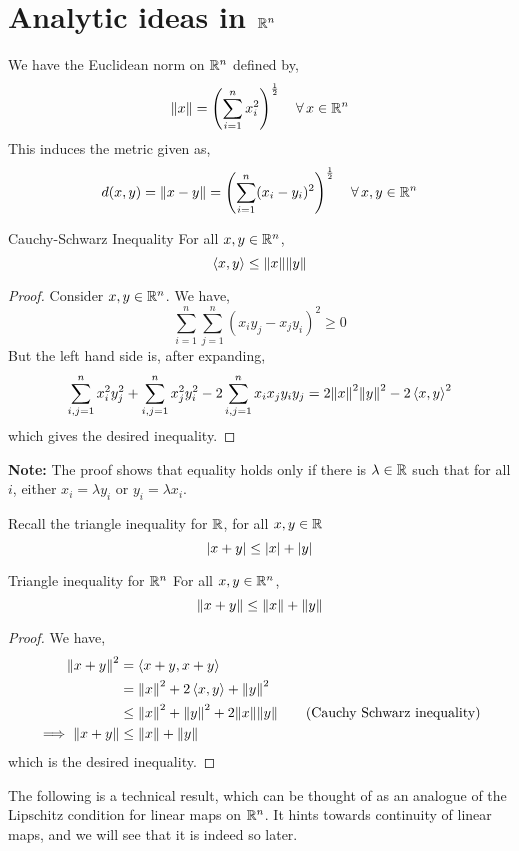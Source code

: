 \documentclass[../Analysis-3.tex]{subfiles}
\begin{document}
\section{Analytic ideas in \texorpdfstring{$ \mathbb{R}^n $}{Rn}}

We have the Euclidean norm on $ \mathbb{R}^n $ defined by,
\[ \norm{x} = \left(\sum_{i=1}^{n}x_i^2\right)^{\frac 12} \quad \forall \, x \in \mathbb{R}^n \]
This induces the metric given as,
\[ d(x,y) = \norm{x-y} = \left(\sum_{i=1}^{n}(x_i-y_i)^2\right)^{\frac 12} \quad \forall \, x,y \in \mathbb{R}^n \]

\begin{Thm}{Cauchy-Schwarz Inequality}{}
  For all $ x,y \in \mathbb{R}^n $, \[ \left\langle {x}, {y} \right\rangle \leq \norm{x} \norm{y} \]
\end{Thm}
\begin{proof}
  Consider $ x,y \in \mathbb{R}^n $. We have,
  \[ \sum_{i=1}^{n}\sum_{j=1}^{n} (x_iy_j - x_jy_i)^2 \geq 0 \]
  But the left hand side is, after expanding,
  \[ \sum_{i,j = 1}^{n} x_i^2y_j^2 + \sum_{i,j = 1}^{n} x_j^2y_i^2 - 2 \sum_{i,j=1}^{n} x_ix_j y_iy_j = 2 \norm{x}^2\norm{y}^2 - 2\left\langle {x}, {y} \right\rangle^2 \]
  which gives the desired inequality.
\end{proof}

\textbf{Note:} The proof shows that equality holds only if there is $ \lambda \in \mathbb{R} $ such that for all $ i $, either $ x_i = \lambda y_i $ or $ y_i = \lambda x_i $.
\msk

Recall the triangle inequality for $ \mathbb{R} $, for all $ x,y \in \mathbb{R} $
\[ \abs{x+y} \leq \abs{x} + \abs{y} \]

\begin{Thm}{Triangle inequality for $ \mathbb{R}^n $}{}
  For all $ x,y \in \mathbb{R}^n $,
  \[ \norm{x+y} \leq \norm{x} + \norm{y} \]
\end{Thm}
\begin{proof}
  We have,
  \begin{align*}
    \norm{x+y}^2
     & = \left\langle {x+y}, {x+y} \right\rangle                                                                 \\
     & = \norm{x}^2 + 2\left\langle {x}, {y} \right\rangle + \norm{y}^2                                             \\
     & \leq \norm{x}^2 + \norm{y}^2 +2 \norm{x}\norm{y} \tag{Cauchy Schwarz inequality} \\
    \implies \norm{x+y}
     & \leq \norm{x} + \norm{y}
  \end{align*}
  which is the desired inequality.
\end{proof}
\msk

The following is a technical result, which can be thought of as an analogue of the Lipschitz condition for linear maps on $ \mathbb{R}^n $. It hints towards continuity of linear maps, and we will see that it is indeed so later.
\ssk
\end{document}
